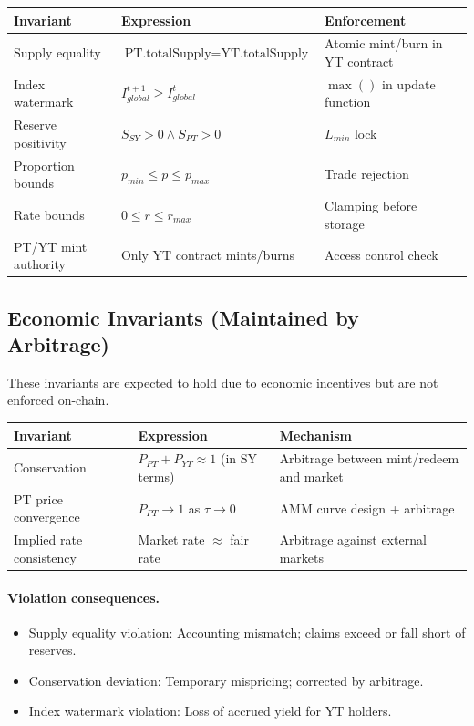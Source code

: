 \begin{center}
\begin{tabularx}{\textwidth}{l >{\raggedright\arraybackslash}X l}
\toprule
\textbf{Invariant} & \textbf{Expression} & \textbf{Enforcement} \\
\midrule
Supply equality & $\text{PT.totalSupply} = \text{YT.totalSupply}$ & Atomic mint/burn in YT contract \\
Index watermark & $I_{global}^{t+1} \geq I_{global}^{t}$ & $\max()$ in update function \\
Reserve positivity & $S_{SY} > 0 \land S_{PT} > 0$ & $L_{min}$ lock \\
Proportion bounds & $p_{min} \leq p \leq p_{max}$ & Trade rejection \\
Rate bounds & $0 \leq r \leq r_{max}$ & Clamping before storage \\
PT/YT mint authority & Only YT contract mints/burns & Access control check \\
\bottomrule
\end{tabularx}
\end{center}

\subsection{Economic Invariants (Maintained by Arbitrage)}

These invariants are expected to hold due to economic incentives but are not enforced on-chain.

\begin{center}
\begin{tabularx}{\textwidth}{l >{\raggedright\arraybackslash}X l}
\toprule
\textbf{Invariant} & \textbf{Expression} & \textbf{Mechanism} \\
\midrule
Conservation & $P_{PT} + P_{YT} \approx 1$ (in SY terms) & Arbitrage between mint/redeem and market \\
PT price convergence & $P_{PT} \to 1$ as $\tau \to 0$ & AMM curve design + arbitrage \\
Implied rate consistency & Market rate $\approx$ fair rate & Arbitrage against external markets \\
\bottomrule
\end{tabularx}
\end{center}

\paragraph{Violation consequences.}
\begin{itemize}
\item Supply equality violation: Accounting mismatch; claims exceed or fall short of reserves.
\item Conservation deviation: Temporary mispricing; corrected by arbitrage.
\item Index watermark violation: Loss of accrued yield for YT holders.
\end{itemize}

